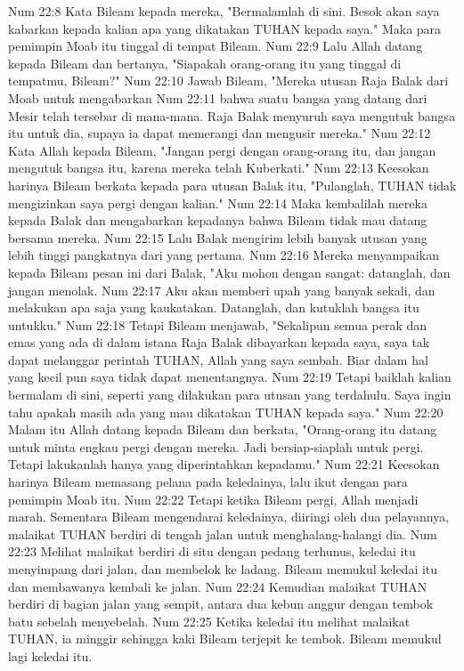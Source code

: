 Num 22:8  Kata Bileam kepada mereka, "Bermalamlah di sini. Besok akan saya kabarkan kepada kalian apa yang dikatakan TUHAN kepada saya." Maka para pemimpin Moab itu tinggal di tempat Bileam.
Num 22:9  Lalu Allah datang kepada Bileam dan bertanya, "Siapakah orang-orang itu yang tinggal di tempatmu, Bileam?"
Num 22:10  Jawab Bileam, "Mereka utusan Raja Balak dari Moab untuk mengabarkan
Num 22:11  bahwa suatu bangsa yang datang dari Mesir telah tersebar di mana-mana. Raja Balak menyuruh saya mengutuk bangsa itu untuk dia, supaya ia dapat memerangi dan mengusir mereka."
Num 22:12  Kata Allah kepada Bileam, "Jangan pergi dengan orang-orang itu, dan jangan mengutuk bangsa itu, karena mereka telah Kuberkati."
Num 22:13  Keesokan harinya Bileam berkata kepada para utusan Balak itu, "Pulanglah, TUHAN tidak mengizinkan saya pergi dengan kalian."
Num 22:14  Maka kembalilah mereka kepada Balak dan mengabarkan kepadanya bahwa Bileam tidak mau datang bersama mereka.
Num 22:15  Lalu Balak mengirim lebih banyak utusan yang lebih tinggi pangkatnya dari yang pertama.
Num 22:16  Mereka menyampaikan kepada Bileam pesan ini dari Balak, "Aku mohon dengan sangat: datanglah, dan jangan menolak.
Num 22:17  Aku akan memberi upah yang banyak sekali, dan melakukan apa saja yang kaukatakan. Datanglah, dan kutuklah bangsa itu untukku."
Num 22:18  Tetapi Bileam menjawab, "Sekalipun semua perak dan emas yang ada di dalam istana Raja Balak dibayarkan kepada saya, saya tak dapat melanggar perintah TUHAN, Allah yang saya sembah. Biar dalam hal yang kecil pun saya tidak dapat menentangnya.
Num 22:19  Tetapi baiklah kalian bermalam di sini, seperti yang dilakukan para utusan yang terdahulu. Saya ingin tahu apakah masih ada yang mau dikatakan TUHAN kepada saya."
Num 22:20  Malam itu Allah datang kepada Bileam dan berkata, "Orang-orang itu datang untuk minta engkau pergi dengan mereka. Jadi bersiap-siaplah untuk pergi. Tetapi lakukanlah hanya yang diperintahkan kepadamu."
Num 22:21  Keesokan harinya Bileam memasang pelana pada keledainya, lalu ikut dengan para pemimpin Moab itu.
Num 22:22  Tetapi ketika Bileam pergi, Allah menjadi marah. Sementara Bileam mengendarai keledainya, diiringi oleh dua pelayannya, malaikat TUHAN berdiri di tengah jalan untuk menghalang-halangi dia.
Num 22:23  Melihat malaikat berdiri di situ dengan pedang terhunus, keledai itu menyimpang dari jalan, dan membelok ke ladang. Bileam memukul keledai itu dan membawanya kembali ke jalan.
Num 22:24  Kemudian malaikat TUHAN berdiri di bagian jalan yang sempit, antara dua kebun anggur dengan tembok batu sebelah menyebelah.
Num 22:25  Ketika keledai itu melihat malaikat TUHAN, ia minggir sehingga kaki Bileam terjepit ke tembok. Bileam memukul lagi keledai itu.
